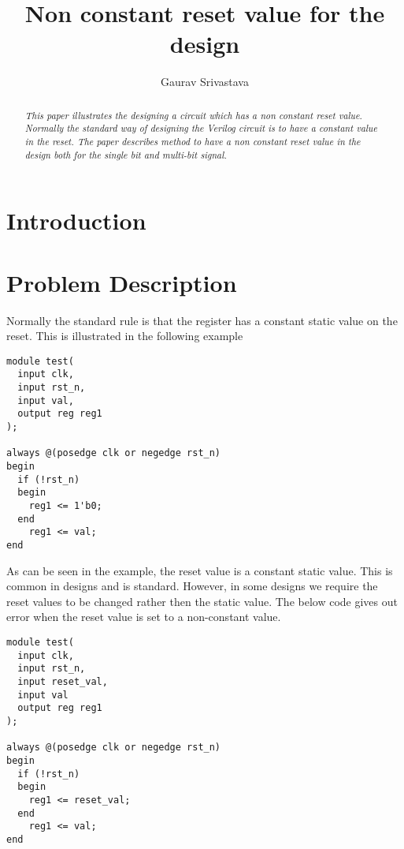 \documentclass[twocolumn,10pt]{asme2ej}
\title{Non constant reset value for the design}
\author{Gaurav Srivastava
    \affiliation{
	Seattle, Washington 98012\\
    Email: gauravsri589@gmail.com
    }	
}
\begin{document}
\maketitle    

\begin{abstract}
{\it This paper illustrates the designing a circuit 
which has a non constant reset value. Normally the 
standard way of designing the Verilog circuit is to have a
constant value in the reset. The paper describes method to have
a non constant reset value in the design both for the single 
bit and multi-bit signal.
}
\end{abstract}

\begin{nomenclature}
\end{nomenclature}


\section{Introduction}
\section{Problem Description}
Normally the standard rule is that the register has a constant static value on the reset. This is illustrated in the following example

\begin{verbatim}
module test(
  input clk,
  input rst_n,
  input val,
  output reg reg1
);

always @(posedge clk or negedge rst_n) 
begin
  if (!rst_n) 
  begin
    reg1 <= 1'b0;
  end
    reg1 <= val;
end
\end{verbatim}

As can be seen in the example, the reset value is a constant static value. This is common in designs and is standard. However, in some designs we require the reset values to be changed rather then the static value. The below code gives out error when the reset value is set to a non-constant value. 

\begin{verbatim}
module test(
  input clk,
  input rst_n,
  input reset_val,
  input val
  output reg reg1
);

always @(posedge clk or negedge rst_n) 
begin
  if (!rst_n) 
  begin
    reg1 <= reset_val;
  end
    reg1 <= val;
end
\end{verbatim}
\end{document}
